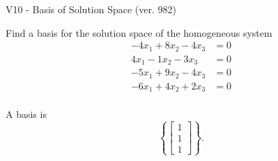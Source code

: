 \begin{exercise}
  \begin{exerciseTitle}V10 - Basis of Solution Space (ver. 982)\end{exerciseTitle}
  \begin{exerciseStatement}
    Find a basis for the solution space of the homogeneous system 
\begin{align*}
 -4 x_ 1 + 8 x_ 2 -4 x_ 3 &= 0  \\ 
  4 x_ 1 -1 x_ 2 -3 x_ 3 &= 0  \\ 
  -5 x_ 1 + 9 x_ 2 -4 x_ 3 &= 0  \\ 
  -6 x_ 1 + 4 x_ 2 + 2 x_ 3 &= 0  \\ 
 \end{align*}


 
  \end{exerciseStatement}

  \begin{exerciseAnswer}
   A basis is   
\[\left\{\left[\begin{array}{c}
1 \\
1 \\
1
\end{array}\right]\right\}.\]

  


  \end{exerciseAnswer}
\end{exercise}